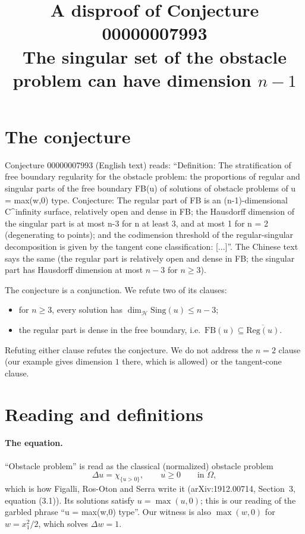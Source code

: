 \documentclass[11pt]{article}
\title{A disproof of Conjecture 00000007993\\[2pt]
\large The singular set of the obstacle problem can have dimension $n-1$}
\date{}
\theoremstyle{definition}
\theoremstyle{remark}
\renewcommand{\_}{\oldus\allowbreak}
\begin{document}
\sloppy
\maketitle

\section{The conjecture}

Conjecture 00000007993 (English text) reads: ``Definition: The stratification of free boundary
regularity for the obstacle problem: the proportions of regular and singular parts of the free
boundary FB(u) of solutions of obstacle problems of u = max(w,0) type. Conjecture: The regular
part of FB is an (n-1)-dimensional C\^{}infinity surface, relatively open and dense in FB; the
Hausdorff dimension of the singular part is at most n-3 for n at least 3, and at most 1 for n = 2
(degenerating to points); and the codimension threshold of the regular-singular decomposition is
given by the tangent cone classification: [...]''. The Chinese text says the same (the regular
part is relatively open and dense in FB; the singular part has Hausdorff dimension at most $n-3$
for $n\ge 3$).

The conjecture is a conjunction. We refute two of its clauses:
\begin{itemize}[nosep]
\item[(D)] for $n\ge 3$, every solution has $\dim_{\mathcal H}\mathrm{Sing}(u)\le n-3$;
\item[(R)] the regular part is dense in the free boundary, i.e.\ $\mathrm{FB}(u)\subseteq
  \overline{\mathrm{Reg}(u)}$.
\end{itemize}
Refuting either clause refutes the conjecture. We do not address the $n=2$ clause (our example
gives dimension $1$ there, which is allowed) or the tangent-cone clause.

\section{Reading and definitions}

\paragraph{The equation.} ``Obstacle problem'' is read as the classical (normalized) obstacle
problem
\[
  \Delta u=\chi_{\{u>0\}},\qquad u\ge 0\qquad\text{in }\Omega,
\]
which is how Figalli, Ros-Oton and Serra write it (arXiv:1912.00714, Section~3, equation (3.1)).
Its solutions satisfy $u=\max(u,0)$; this is our reading of the garbled phrase ``u = max(w,0)
type''. Our witness is also $\max(w,0)$ for $w=x_1^2/2$, which solves $\Delta w=1$.
\end{document}
